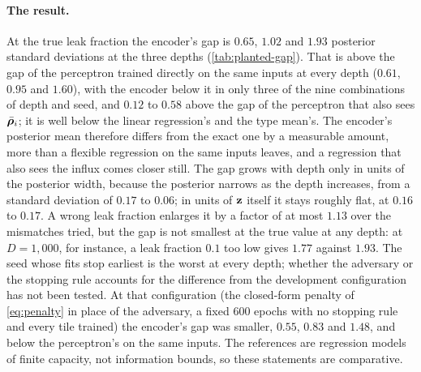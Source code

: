\paragraph{The result.}
 At the true leak fraction the encoder's gap is $0.65$, $1.02$ and $1.93$ posterior standard deviations at the three depths (\cref{tab:planted-gap}). That is above the gap of the perceptron trained directly on the same inputs at every depth ($0.61$, $0.95$ and $1.60$), with the encoder below it in only three of the nine combinations of depth and seed, and $0.12$ to $0.58$ above the gap of the perceptron that also sees $\bar{\boldsymbol{\rho}}_i$; it is well below the linear regression's and the type mean's. The encoder's posterior mean therefore differs from the exact one by a measurable amount, more than a flexible regression on the same inputs leaves, and a regression that also sees the influx comes closer still. The gap grows with depth only in units of the posterior width, because the posterior narrows as the depth increases, from a standard deviation of $0.17$ to $0.06$; in units of $\mathbf{z}$ itself it stays roughly flat, at $0.16$ to $0.17$. A wrong leak fraction enlarges it by a factor of at most $1.13$ over the mismatches tried, but the gap is not smallest at the true value at any depth: at $D = 1{,}000$, for instance, a leak fraction $0.1$ too low gives $1.77$ against $1.93$. The seed whose fits stop earliest is the worst at every depth; whether the adversary or the stopping rule accounts for the difference from the development configuration has not been tested. At that configuration (the closed-form penalty of \cref{eq:penalty} in place of the adversary, a fixed $600$ epochs with no stopping rule and every tile trained) the encoder's gap was smaller, $0.55$, $0.83$ and $1.48$, and below the perceptron's on the same inputs. The references are regression models of finite capacity, not information bounds, so these statements are comparative.

